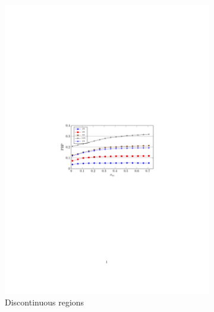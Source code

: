 \documentclass[preprint,10pt,5p,times,twocolumn]{elsarticle}
\begin{document}
\begin{figure}[t]
\centering
\begin{subfigure}[b]{0.35\linewidth}
    \includegraphics[width=\linewidth]{PBP1.pdf}
    \caption{Discontinuous regions}
    \label{fig}
\end{subfigure}%
\begin{subfigure}[b]{0.35\linewidth}

\end{subfigure}
\end{figure}
\end{document}
